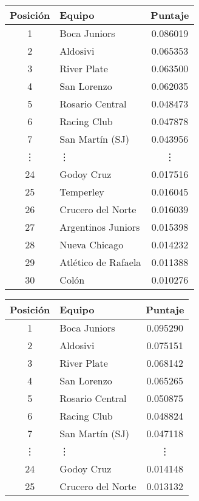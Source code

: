 \begin{table}[H]
    \begin{center}
        \begin{tabular}{| c | l | c |}
            \hline
            Posición & Equipo & Puntaje \\ \hline
            1 & Boca Juniors & 0.086019 \\
            2 & Aldosivi & 0.065353 \\
            3 & River Plate & 0.063500 \\
            4 & San Lorenzo & 0.062035 \\
            5 & Rosario Central & 0.048473 \\
            6 & Racing Club & 0.047878 \\
            7 & San Martín (SJ) & 0.043956 \\
            \vdots & \quad\vdots & \vdots \\
            24 & Godoy Cruz & 0.017516 \\
            25 & Temperley & 0.016045 \\
            26 & Crucero del Norte & 0.016039 \\
            27 & Argentinos Juniors & 0.015398 \\
            28 & Nueva Chicago & 0.014232 \\
            29 & Atlético de Rafaela & 0.011388 \\
            30 & Colón & 0.010276 \\
            \hline
        \end{tabular}
        \begin{tabular}{| c | l | c |}
            \hline
            Posición & Equipo & Puntaje \\ \hline
            1 & Boca Juniors & 0.095290 \\
            2 & Aldosivi & 0.075151 \\
            3 & River Plate & 0.068142 \\
            4 & San Lorenzo & 0.065265 \\
            5 & Rosario Central & 0.050875 \\
            6 & Racing Club & 0.048824 \\
            7 & San Martín (SJ) & 0.047118 \\
            \vdots & \quad\vdots & \vdots \\
            24 & Godoy Cruz & 0.014148 \\
            25 & Crucero del Norte & 0.013132 \\

\end{tabular}
\end{center}
\end{table}

